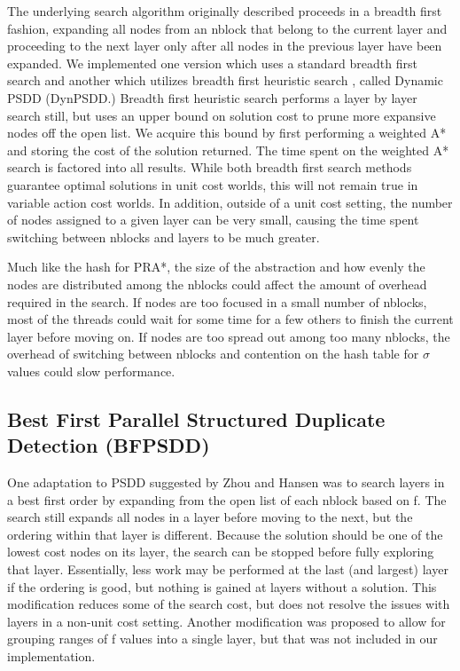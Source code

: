 \documentclass{article}
\begin{document}
The underlying search algorithm originally described proceeds in a breadth first fashion, expanding all nodes from an nblock that belong to the current layer and proceeding to the next layer only after all nodes in the previous layer have been expanded. We implemented one version which uses a standard breadth first search and another which utilizes breadth first heuristic search \cite{zhou:bhs}, called Dynamic PSDD (DynPSDD.) Breadth first heuristic search performs a layer by layer search still, but uses an upper bound on solution cost to prune more expansive nodes off the open list. We acquire this bound by first performing a weighted A* and storing the cost of the solution returned. The time spent on the weighted A* search is factored into all results. While both breadth first search methods guarantee optimal solutions in unit cost worlds, this will not remain true in variable action cost worlds. In addition, outside of a unit cost setting, the number of nodes assigned to a given layer can be very small, causing the time spent switching between nblocks and layers to be much greater.

Much like the hash for PRA*, the size of the abstraction and how evenly the nodes are distributed among the nblocks could affect the amount of overhead required in the search. If nodes are too focused in a small number of nblocks, most of the threads could wait for some time for a few others to finish the current layer before moving on. If nodes are too spread out among too many nblocks, the overhead of switching between nblocks and contention on the hash table for $\sigma$ values could slow performance.
\subsection{Best First Parallel Structured Duplicate Detection (BFPSDD)}
One adaptation to PSDD suggested by Zhou and Hansen was to search layers in a best first order \cite{zhou:sdd} by expanding from the open list of each nblock based on f. The search still expands all nodes in a layer before moving to the next, but the ordering within that layer is different. Because the solution should be one of the lowest cost nodes on its layer, the search can be stopped before fully exploring that layer. Essentially, less work may be performed at the last (and largest) layer if the ordering is good, but nothing is gained at layers without a solution. This modification reduces some of the search cost, but does not resolve the issues with layers in a non-unit cost setting. Another modification was proposed to allow for grouping ranges of f values into a single layer, but that was not included in our implementation.
\end{document}
